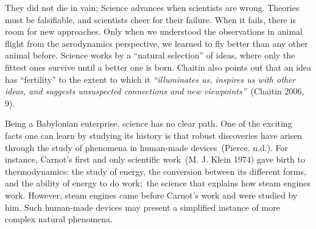\documentclass[
  letterpaper,
  12pt,
  british]{tufte-book}
\theoremstyle{plain}
\theoremstyle{definition}
\theoremstyle{plain}
\theoremstyle{remark}
\begin{document}
They did not die in vain;
Science advances when scientists are wrong. Theories must be
falsifiable, and scientists cheer for their failure. When it fails,
there is room for new approaches. Only when we understood the
observations in animal flight from the aerodynamics perspective, we
learned to fly better than any other animal before. Science works by a
``natural selection'' of ideas, where only the fittest ones survive
until a better one is born. Chaitin also points out that an idea has
``fertility'' to the extent to which it \emph{``illuminates us, inspires
us with other ideas, and suggests unsuspected connections and new
viewpoints''}~(Chaitin 2006,
9).

Being a Babylonian enterprise, science has no clear path. One of the
exciting facts one can learn by studying its history is that robust
discoveries have arisen through the study of phenomena in human-made
devices~(Pierce,
n.d.).
For instance, Carnot's first and only scientific work~(M. J. Klein
1974)
gave birth to thermodynamics: the study of energy, the conversion
between its different forms, and the ability of energy to do work;~the
science that explains how steam engines work. However, steam engines
came before Carnot's work and were studied by him. Such human-made
devices may present a simplified instance of more complex natural
phenomena.
\end{document}
